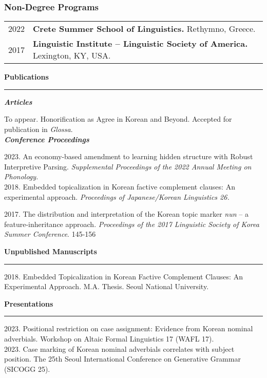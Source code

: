\documentclass[11pt]{article}
\newcommand{\sect}[1]{{\fontsize{15}{25}\selectfont \textbf{#1}} {\vspace{0.1cm}} \hrule {\vspace{0.3cm}}}
\newcommand{\subsect}[1]{{\fontsize{12}{18}\selectfont \textit{\textbf{#1}}} {\vspace{0.3cm}}}
\begin{document}
\subsubsection*{Non-Degree Programs}
\begin{tabular}{p{}|p{}}
{2022}&{{\textbf{Crete Summer School of Linguistics.}} Rethymno, Greece.}\\
{2017}&{\textbf{Linguistic Institute -- Linguistic Society of America.} Lexington, KY, USA.}\\
\end{tabular}


{\vspace{1cm}}

{\sect{Publications}}

{\subsect{Articles}}

To appear. Honorification as Agree in Korean and Beyond. Accepted for publication in {\textit{Glossa}}.\\

{\subsect{Conference Proceedings}}

{2023. An economy-based amendment to learning hidden structure with Robust Interpretive Parsing. \textit{Supplemental Proceedings of the 2022 Annual Meeting on Phonology.}}\\

{2018. Embedded topicalization in Korean factive complement clauses: An experimental approach. \textit{Proceedings of Japanese/Korean Linguistics 26.}}\\

{2017. The distribution and interpretation of the Korean topic marker \textit{nun} -- a feature-inheritance approach. \textit{Proceedings of the 2017 Linguistic Society of Korea Summer Conference}. 145-156\\

{\sect{Unpublished Manuscripts}}}

2018. Embedded Topicalization in Korean Factive Complement Clauses: An Experimental Approach. M.A. Thesis. Seoul National University.


{\pagebreak}

\sect{Presentations}

{2023. Positional restriction on case assignment: Evidence from Korean nominal adverbials. Workshop on Altaic Formal Linguistics 17 (WAFL 17).}\\

{2023. Case marking of Korean nominal adverbials correlates with subject position. The 25th Seoul International Conference on Generative Grammar (SICOGG 25).}\\
\end{document}

